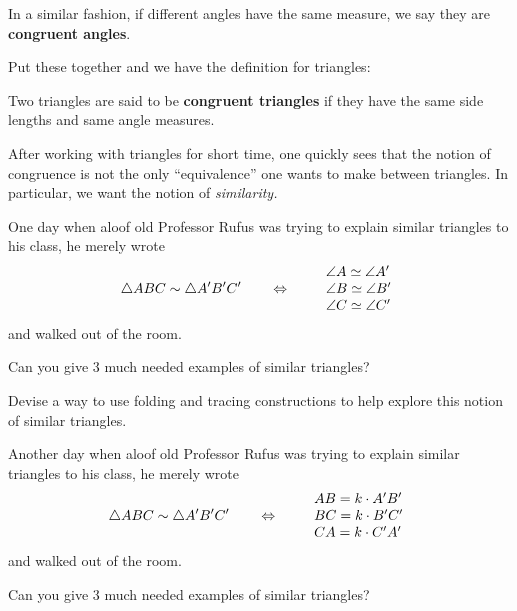 \begin{definition}
In a similar fashion, if different angles have the same measure, we
say they are \textbf{congruent angles}.
\end{definition}

Put these together and we have the definition for triangles:

\begin{definition} 
Two triangles are said to be \textbf{congruent triangles} if they have
the same side lengths and same angle measures.
\end{definition}

After working with triangles for short time, one quickly sees that the
notion of congruence is not the only ``equivalence'' one wants to
make between triangles. In particular, we want the notion of
\textit{similarity.} 

One day when aloof old Professor Rufus was trying to explain similar
triangles to his class, he merely wrote
\[
\triangle ABC \sim \triangle A'B'C' \qquad\Leftrightarrow \qquad\begin{array}{l}
\angle A \simeq \angle A'\\
\angle B \simeq \angle B' \\
\angle C \simeq \angle C'
\end{array}
\]
and walked out of the room.

\begin{question} 
Can you give $3$ much needed examples of similar triangles? 
\end{question}
\QM

\begin{question} 
Devise a way to use folding and tracing constructions to help explore this notion
of similar triangles.
\end{question}
\QM

Another day when aloof old Professor Rufus was trying to explain
similar triangles to his class, he merely wrote
\[
\triangle ABC \sim \triangle A'B'C' \qquad\Leftrightarrow \qquad
\begin{array}{l}
AB = k\cdot A'B'\\
BC = k\cdot B'C' \\
CA = k\cdot C'A'
\end{array}
\]
and walked out of the room.

\begin{question} 
Can you give $3$ much needed examples of similar triangles? 
\end{question}
\QM

